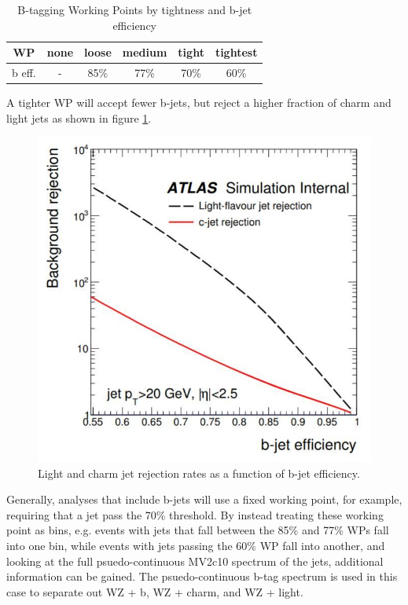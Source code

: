 \documentclass[NOTE, atlasdraft=true, texlive=2016, UKenglish]{\ATLASLATEXPATH atlasdoc}
\begin{document}
\begin{table}[H]
\begin{center}
\begin{tabular}{|c|ccccc|}
    \hline
       WP &  none & loose & medium & tight & tightest\\
       \hline
     b eff. & - & 85\% & 77\% & 70\% & 60\% \\ 
    \hline
    \end{tabular}    
    \caption{B-tagging Working Points by tightness and b-jet efficiency}
    \label{tab:btag_WPs}
    \end{center}
\end{table}

A tighter WP will accept fewer b-jets, but reject a higher fraction of charm and light jets as shown in figure \ref{fig:jet_rejection}. 

\begin{figure}[H]
    \centering
    \includegraphics[width=0.6\linewidth]{btag_rejection_rate.jpg}
    \caption{Light and charm jet rejection rates as a function of b-jet efficiency.}
    \label{fig:jet_rejection}
\end{figure}

Generally, analyses that include b-jets will use a fixed working point, for example, requiring that a jet pass the 70\% threshold. By instead treating these working point as bins, e.g. events with jets that fall between the 85\% and 77\% WPs fall into one bin, while events with jets passing the 60\% WP fall into another, and looking at the full psuedo-continuous MV2c10 spectrum of the jets, additional information can be gained. The psuedo-continuous b-tag spectrum is used in this case to separate out WZ + b, WZ + charm, and WZ + light. 

\end{document}
